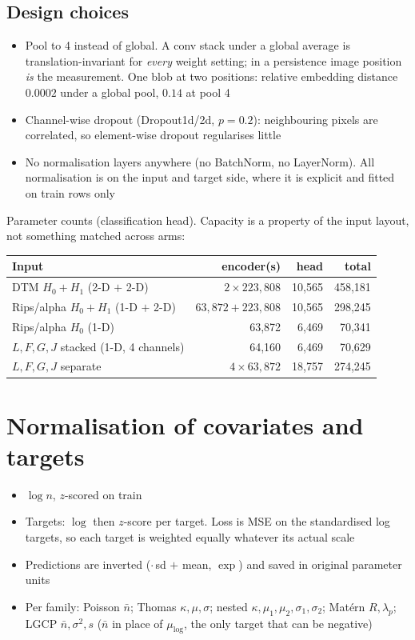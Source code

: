 \documentclass[11pt]{article}
\newcommand{\nb}{\bar n}
\begin{document}
\subsection*{Design choices}
\begin{itemize}
  \item Pool to 4 instead of global. A conv stack under a global average is translation-invariant for \emph{every} weight setting; in a persistence image position \emph{is} the measurement. One blob at two positions: relative embedding distance $0.0002$ under a global pool, $0.14$ at pool 4
  \item Channel-wise dropout (Dropout1d/2d, $p=0.2$): neighbouring pixels are correlated, so element-wise dropout regularises little
  \item No normalisation layers anywhere (no BatchNorm, no LayerNorm). All normalisation is on the input and target side, where it is explicit and fitted on train rows only
\end{itemize}

\smallskip
Parameter counts (classification head). Capacity is a property of the input layout, not something matched across arms:

\smallskip
\begin{tabular}{@{}lrrr@{}}
\toprule
Input & encoder(s) & head & total \\
\midrule
DTM $H_0{+}H_1$ (2-D $+$ 2-D)          & $2\times223{,}808$ & 10{,}565 & 458{,}181 \\
Rips/alpha $H_0{+}H_1$ (1-D $+$ 2-D)   & $63{,}872 + 223{,}808$ & 10{,}565 & 298{,}245 \\
Rips/alpha $H_0$ (1-D)                 & 63{,}872 & 6{,}469 & 70{,}341 \\
$L,F,G,J$ stacked (1-D, 4 channels)    & 64{,}160 & 6{,}469 & 70{,}629 \\
$L,F,G,J$ separate                     & $4\times63{,}872$ & 18{,}757 & 274{,}245 \\
\bottomrule
\end{tabular}

\section{Normalisation of covariates and targets}
\begin{itemize}
  \item $\log n$, $z$-scored on train
  \item Targets: $\log$ then $z$-score per target. Loss is MSE on the standardised log targets, so each target is weighted equally whatever its actual scale
  \item Predictions are inverted ($\cdot\,$sd $+$ mean, $\exp$) and saved in original parameter units
  \item Per family: Poisson $\nb$; Thomas $\kappa,\mu,\sigma$; nested $\kappa,\mu_1,\mu_2,\sigma_1,\sigma_2$; Mat\'ern $R,\lambda_p$; LGCP $\nb,\sigma^2,s$ ($\nb$ in place of $\mu_{\log}$, the only target that can be negative)
\end{itemize}
\end{document}
